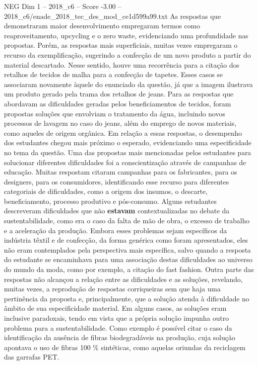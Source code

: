 \begin{textsample}{NEG Dim 1 – 2018\_c6 – Score -3.00 – 2018\_c6/enade\_2018\_tec\_des\_mod\_ce1d599a99.txt}
As respostas que demonstraram maior desenvolvimento empregaram termos como reaproveitamento, upcycling e o zero waste, evidenciando uma profundidade nas propostas.
Porém, as respostas mais superficiais, muitas vezes empregaram o recurso da exemplificação, sugerindo a confecção de um novo produto a partir do material descartado.
Nesse sentido, houve uma recorrência para a citação dos retalhos de tecidos de malha para a confecção de tapetes.
Esses casos se associaram novamente àquele do enunciado da questão, já que a imagem ilustrava um produto gerado pela trama dos retalhos de jeans.
Para as respostas que abordavam as dificuldades geradas pelos beneficiamentos de tecidos, foram propostas soluções que envolviam o tratamento da água, incluindo novos processos de lavagem no caso do jeans, além do emprego de novos materiais, como aqueles de origem orgânica.
Em relação a essas respostas, o desempenho dos estudantes chegou mais próximo o esperado, evidenciando uma especificidade no tema da questão.
Uma das propostas mais mencionadas pelos estudantes para solucionar diferentes dificuldades foi a conscientização através de campanhas de educação.
Muitas respostam citaram campanhas para os fabricantes, para os designers, para os consumidores, identificando esse recurso para diferentes categoriais de dificuldades, como a origem dos insumos, o descarte, beneficiamento, processo produtivo e pós-consumo.
Alguns estudantes descreveram dificuldades que não \textbf{estavam} contextualizadas no debate da sustentabilidade, como era o caso da falta de mão de obra, o excesso de trabalho e a aceleração da produção.
Embora esses problemas sejam específicos da indústria têxtil e de confecção, da forma genérica como foram apresentados, eles não eram contemplados pela perspectiva mais específica, salvo quando a resposta do estudante se encaminhava para uma associação destas dificuldades ao universo do mundo da moda, como por exemplo, a citação do fast fashion.
Outra parte das respostas não alcançou a relação entre as dificuldades e as soluções, revelando, muitas vezes, a reprodução de respostas corriqueiras sem que haja uma pertinência da proposta e, principalmente, que a solução atenda à dificuldade no âmbito de sua especificidade material.
Em alguns casos, as soluções eram inclusive paradoxais, tendo em vista que a própria solução impunha outro problema para a sustentabilidade.
Como exemplo é possível citar o caso da identificação da ausência de fibras biodegradáveis na produção, cuja solução apontava o uso de fibras 100 \% sintéticas, como aquelas oriundas da reciclagem das garrafas PET.

\end{textsample}
